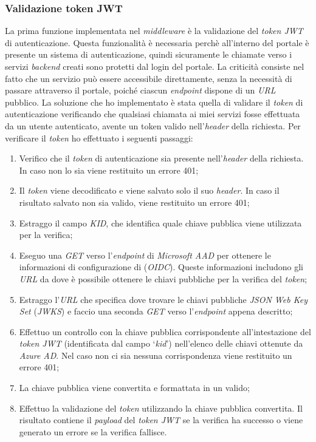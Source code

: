 \subsubsection{Validazione token JWT}\label{subsubsec:validazione-token-jwt}
La prima funzione implementata nel \textit{middleware} è la validazione del \textit{token JWT} di autenticazione. Questa funzionalità è necessaria perchè all'interno del portale è presente un sistema di autenticazione, quindi sicuramente le chiamate verso i servizi \textit{backend} creati sono protetti dal login del portale.
La criticità consiste nel fatto che un servizio può essere accessibile direttamente, senza la necessità di passare attraverso il portale, poiché ciascun \textit{endpoint} dispone di un \textit{URL} pubblico.
La soluzione che ho implementato è stata quella di validare il \textit{token} di autenticazione verificando che qualsiasi chiamata ai miei servizi fosse effettuata da un utente autenticato, avente un token valido nell'\textit{header} della richiesta.
Per verificare il \textit{token} ho effettuato i seguenti passaggi:
\begin{enumerate}
  \item Verifico che il \textit{token} di autenticazione sia presente nell'\textit{header} della richiesta. In caso non lo sia viene restituito un errore 401;
  \item Il \textit{token} viene decodificato e viene salvato solo il suo \textit{header}. In caso il risultato salvato non sia valido, viene restituito un errore 401;
  \item Estraggo il campo \textit{KID}, che identifica quale chiave pubblica viene utilizzata per la verifica;
  \item Eseguo una \textit{GET} verso l'\textit{endpoint} di \textit{Microsoft AAD} per ottenere le informazioni di configurazione di  (\textit{OIDC}). 
  Queste informazioni includono gli \textit{URL} da dove è possibile ottenere le chiavi pubbliche per la verifica del \textit{token};
  \item Estraggo l'\textit{URL} che specifica dove trovare le chiavi pubbliche \textit{JSON Web Key Set} (\textit{JWKS}) e faccio una seconda \textit{GET} verso l'\textit{endpoint} appena descritto;
  \item Effettuo un controllo con la chiave pubblica corrispondente all'intestazione del \textit{token JWT} (identificata dal campo `\textit{kid}') nell'elenco delle chiavi ottenute da \textit{Azure AD}. Nel caso non ci sia nessuna corrispondenza viene restituito un errore 401;
  \item La chiave pubblica viene convertita e formattata in un  valido;
  \item Effettuo la validazione del \textit{token} utilizzando la chiave pubblica convertita. Il risultato contiene il \textit{payload} del \textit{token JWT} se la verifica ha successo o viene generato un errore se la verifica fallisce.
\end{enumerate}

